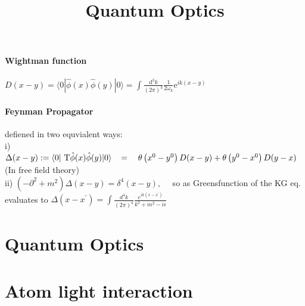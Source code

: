 \paragraph{Wightman function} $D(x-y)=\langle 0|\hat{\phi}(x) \hat{\phi}(y)| 0\rangle = \int \frac{\mathrm{d}^3 k}{(2 \pi)^3} \frac{1}{2 \omega_k} \mathrm{e}^{i k(x-y)}$

\paragraph{Feynman Propagator} defiened in two equvialent ways:\\
i) $\Delta(x-y) :=\langle 0|\mathrm{~T} \hat{\phi}(x) \hat{\phi}(y)| 0\rangle  \hspace{0.3cm}= \quad \theta\left(x^0-y^0\right) D(x-y)+\theta\left(y^0-x^0\right) D(y-x)$ (In free field theory)\\
ii) $\left(-\partial^2+m^2\right) \Delta(x-y) =\delta^4(x-y), \quad$ so as Greensfunction of the KG eq.
evaluates to $\Delta\left(x-x^{\prime}\right)=\int \frac{d^4 k}{(2 \pi)^4} \frac{e^{i k\left(x-x^{\prime}\right)}}{k^2+m^2-i \epsilon}$



\title{Quantum Optics}
\date{}
\maketitle

\section{Quantum Optics}

\section{Atom light interaction}

